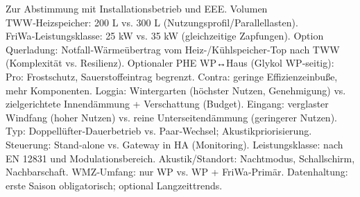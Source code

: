 \markdownRendererDocumentBegin
\markdownRendererSectionBegin
{}\markdownRendererInterblockSeparator
{}Zur Abstimmung mit Installationsbetrieb und EEE.\markdownRendererInterblockSeparator
{}\markdownRendererSectionBegin
{}\markdownRendererInterblockSeparator
{}\markdownRendererUlBeginTight
\markdownRendererUlItem Volumen TWW‑Heizspeicher: 200 L vs. 300 L (Nutzungsprofil/Parallellasten).\markdownRendererUlItemEnd 
\markdownRendererUlItem FriWa‑Leistungsklasse: 25 kW vs. 35 kW (gleichzeitige Zapfungen).\markdownRendererUlItemEnd 
\markdownRendererUlItem Option Querladung: Notfall‑Wärmeübertrag vom Heiz-/Kühlspeicher‑Top nach TWW (Komplexität vs. Resilienz).\markdownRendererUlItemEnd 
\markdownRendererUlEndTight \markdownRendererInterblockSeparator
{}
\markdownRendererSectionEnd \markdownRendererSectionBegin
{}\markdownRendererInterblockSeparator
{}\markdownRendererUlBeginTight
\markdownRendererUlItem Optionaler PHE WP↔Haus (Glykol WP‑seitig):\markdownRendererUlItemEnd 
\markdownRendererUlItem Pro: Frostschutz, Sauerstoffeintrag begrenzt.\markdownRendererUlItemEnd 
\markdownRendererUlItem Contra: geringe Effizienzeinbuße, mehr Komponenten.\markdownRendererUlItemEnd 
\markdownRendererUlEndTight \markdownRendererInterblockSeparator
{}
\markdownRendererSectionEnd \markdownRendererSectionBegin
{}\markdownRendererInterblockSeparator
{}\markdownRendererUlBeginTight
\markdownRendererUlItem Loggia: Wintergarten (höchster Nutzen, Genehmigung) vs. zielgerichtete Innendämmung + Verschattung (Budget).\markdownRendererUlItemEnd 
\markdownRendererUlItem Eingang: verglaster Windfang (hoher Nutzen) vs. reine Unterseitendämmung (geringerer Nutzen).\markdownRendererUlItemEnd 
\markdownRendererUlEndTight \markdownRendererInterblockSeparator
{}
\markdownRendererSectionEnd \markdownRendererSectionBegin
{}\markdownRendererInterblockSeparator
{}\markdownRendererUlBeginTight
\markdownRendererUlItem Typ: Doppellüfter‑Dauerbetrieb vs. Paar‑Wechsel; Akustikpriorisierung.\markdownRendererUlItemEnd 
\markdownRendererUlItem Steuerung: Stand‑alone vs. Gateway in HA (Monitoring).\markdownRendererUlItemEnd 
\markdownRendererUlEndTight \markdownRendererInterblockSeparator
{}
\markdownRendererSectionEnd \markdownRendererSectionBegin
{}\markdownRendererInterblockSeparator
{}\markdownRendererUlBeginTight
\markdownRendererUlItem Leistungsklasse: nach EN 12831 und Modulationsbereich.\markdownRendererUlItemEnd 
\markdownRendererUlItem Akustik/Standort: Nachtmodus, Schallschirm, Nachbarschaft.\markdownRendererUlItemEnd 
\markdownRendererUlEndTight \markdownRendererInterblockSeparator
{}
\markdownRendererSectionEnd \markdownRendererSectionBegin
{}\markdownRendererInterblockSeparator
{}\markdownRendererUlBeginTight
\markdownRendererUlItem WMZ‑Umfang: nur WP vs. WP + FriWa‑Primär.\markdownRendererUlItemEnd 
\markdownRendererUlItem Datenhaltung: erste Saison obligatorisch; optional Langzeittrends.\markdownRendererUlItemEnd 
\markdownRendererUlEndTight 
\markdownRendererSectionEnd 
\markdownRendererSectionEnd \markdownRendererDocumentEnd